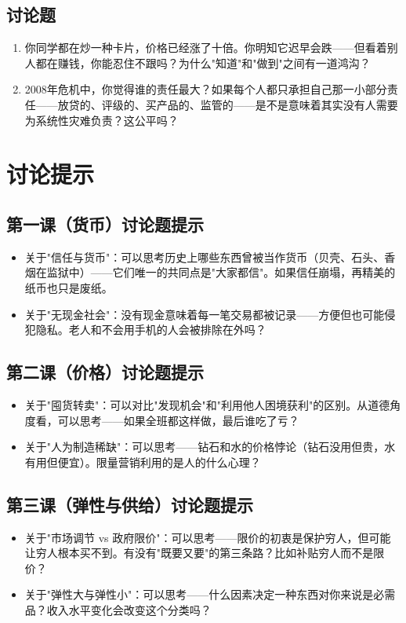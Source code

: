 \documentclass[a4paper,12pt]{ctexart}
\begin{document}
\subsection*{讨论题}
\begin{enumerate}
  \item 你同学都在炒一种卡片，价格已经涨了十倍。你明知它迟早会跌——但看着别人都在赚钱，你能忍住不跟吗？为什么"知道"和"做到"之间有一道鸿沟？
  \item 2008年危机中，你觉得谁的责任最大？如果每个人都只承担自己那一小部分责任——放贷的、评级的、买产品的、监管的——是不是意味着其实没有人需要为系统性灾难负责？这公平吗？
\end{enumerate}

\section*{讨论提示}

\subsection*{第一课（货币）讨论题提示}
\begin{itemize}
  \item 关于"信任与货币"：可以思考历史上哪些东西曾被当作货币（贝壳、石头、香烟在监狱中）——它们唯一的共同点是"大家都信"。如果信任崩塌，再精美的纸币也只是废纸。
  \item 关于"无现金社会"：没有现金意味着每一笔交易都被记录——方便但也可能侵犯隐私。老人和不会用手机的人会被排除在外吗？
\end{itemize}

\subsection*{第二课（价格）讨论题提示}
\begin{itemize}
  \item 关于"囤货转卖"：可以对比"发现机会"和"利用他人困境获利"的区别。从道德角度看，可以思考——如果全班都这样做，最后谁吃了亏？
  \item 关于"人为制造稀缺"：可以思考——钻石和水的价格悖论（钻石没用但贵，水有用但便宜）。限量营销利用的是人的什么心理？
\end{itemize}

\subsection*{第三课（弹性与供给）讨论题提示}
\begin{itemize}
  \item 关于"市场调节 vs 政府限价"：可以思考——限价的初衷是保护穷人，但可能让穷人根本买不到。有没有"既要又要"的第三条路？比如补贴穷人而不是限价？
  \item 关于"弹性大与弹性小"：可以思考——什么因素决定一种东西对你来说是必需品？收入水平变化会改变这个分类吗？
\end{itemize}
\end{document}
